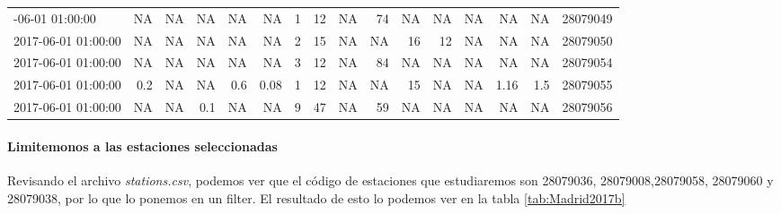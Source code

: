 \documentclass[]{book}
\newenvironment{Shaded}{\begin{snugshade}}{\end{snugshade}}
\newcommand{\DecValTok}[1]{\textcolor[rgb]{0.00,0.00,0.81}{#1}}
\newcommand{\KeywordTok}[1]{\textcolor[rgb]{0.13,0.29,0.53}{\textbf{#1}}}
\newcommand{\NormalTok}[1]{#1}
\newcommand{\OperatorTok}[1]{\textcolor[rgb]{0.81,0.36,0.00}{\textbf{#1}}}
\newcommand{\StringTok}[1]{\textcolor[rgb]{0.31,0.60,0.02}{#1}}
\let\oldparagraph\paragraph
\renewcommand{\paragraph}[1]{\oldparagraph{#1}\mbox{}}
\begin{document}
\begin{table}
\begin{tabular}[t]{lrlrrrrrlrrrrrrr}
\addlinespace
2017-06-01 01:00:00 & NA & NA & NA & NA & NA & 1 & 12 & NA & 74 & NA & NA & NA & NA & NA & 28079049\\
2017-06-01 01:00:00 & NA & NA & NA & NA & NA & 2 & 15 & NA & NA & 16 & 12 & NA & NA & NA & 28079050\\
2017-06-01 01:00:00 & NA & NA & NA & NA & NA & 3 & 12 & NA & 84 & NA & NA & NA & NA & NA & 28079054\\
2017-06-01 01:00:00 & 0.2 & NA & NA & 0.6 & 0.08 & 1 & 12 & NA & NA & 15 & NA & NA & 1.16 & 1.5 & 28079055\\
2017-06-01 01:00:00 & NA & NA & 0.1 & NA & NA & 9 & 47 & NA & 59 & NA & NA & NA & NA & NA & 28079056\\
\bottomrule
\end{tabular}
\end{table}

\hypertarget{limitemonos-a-las-estaciones-seleccionadas}{%
\paragraph{Limitemonos a las estaciones
seleccionadas}\label{limitemonos-a-las-estaciones-seleccionadas}}

Revisando el archivo \emph{stations.csv}, podemos ver que el código de
estaciones que estudiaremos son 28079036, 28079008,28079058, 28079060 y
28079038, por lo que lo ponemos en un filter. El resultado de esto lo
podemos ver en la tabla \ref{tab:Madrid2017b}

\begin{Shaded}
\end{Shaded}
\end{document}
